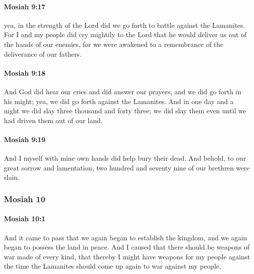 		\paragraph{Mosiah 9:17} %
			\label{MOSIAH-9-17}

			yea, in the strength of the Lord did we go forth to battle against the Lamanites.
			For I and my people did cry mightily to the Lord
			that he would deliver us out of the hands of our enemies,
			for we were awakened to a remembrance of the deliverance of our fathers.

		\paragraph{Mosiah 9:18} %
			\label{MOSIAH-9-18}

			And God did hear our cries and did answer our prayers,
			and we did go forth in his might;
			yea, we did go forth against the Lamanites.
			And in one day and a night we did slay three thousand and forty three;
			we did slay them even until we had driven them out of our land.

		\paragraph{Mosiah 9:19} %
			\label{MOSIAH-9-19}

			And I myself with mine own hands did help bury their dead.
			And behold, to our great sorrow and lamentation,
			two hundred and seventy nine of our brethren were slain.

	\subsubsection{Mosiah 10} %
		\label{MOSIAH-10}
		
		\paragraph{Mosiah 10:1} %
			\label{MOSIAH-10-1}

			And it came to pass that we again began to establish the kingdom,
			and we again began to possess the land in peace.
			And I caused that there should be weapons of war made of every kind,
			that thereby I might have weapons for my people
			against the time the Lamanites should come up again to war against my people.


